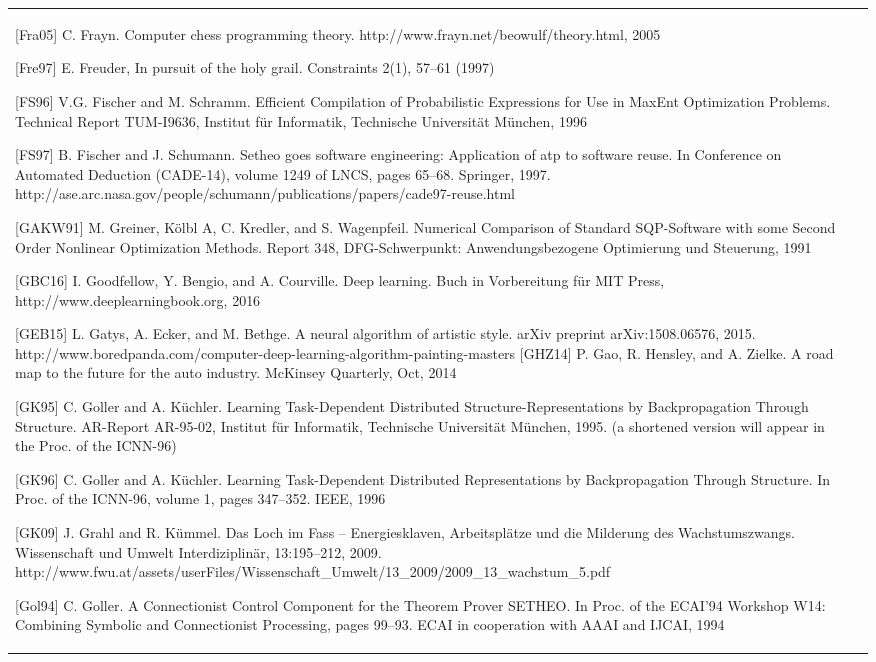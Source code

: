 \documentclass[10pt]{book}
\begin{document}
\begin{tabular}{|l|l|}
[Fra05] C. Frayn. Computer chess programming theory. http://www.frayn.net/beowulf/theory.html, 2005

[Fre97] E. Freuder, In pursuit of the holy grail. Constraints 2(1), 57–61 (1997)

[FS96] V.G. Fischer and M. Schramm. Efficient Compilation of Probabilistic Expressions for Use in MaxEnt Optimization Problems. Technical Report TUM-I9636, Institut für Informatik, Technische Universität München, 1996

[FS97] B. Fischer and J. Schumann. Setheo goes software engineering: Application of atp to software reuse. In Conference on Automated Deduction (CADE-14), volume 1249 of LNCS, pages 65–68. Springer, 1997. http://ase.arc.nasa.gov/people/schumann/publications/papers/cade97-reuse.html

[GAKW91] M. Greiner, Kölbl A, C. Kredler, and S. Wagenpfeil. Numerical Comparison of Standard SQP-Software with some Second Order Nonlinear Optimization Methods. Report 348, DFG-Schwerpunkt: Anwendungsbezogene Optimierung und Steuerung, 1991

[GBC16] I. Goodfellow, Y. Bengio, and A. Courville. Deep learning. Buch in Vorbereitung für MIT Press, http://www.deeplearningbook.org, 2016

[GEB15] L. Gatys, A. Ecker, and M. Bethge. A neural algorithm of artistic style. arXiv preprint arXiv:1508.06576, 2015. http://www.boredpanda.com/computer-deep-learning-algorithm-painting-masters
[GHZ14] P. Gao, R. Hensley, and A. Zielke. A road map to the future for the auto industry. McKinsey Quarterly, Oct, 2014

[GK95] C. Goller and A. Küchler. Learning Task-Dependent Distributed Structure-Representations by Backpropagation Through Structure. AR-Report AR-95-02, Institut für Informatik, Technische Universität München, 1995. (a shortened version will appear in the Proc. of the ICNN-96)

[GK96] C. Goller and A. Küchler. Learning Task-Dependent Distributed Representations by Backpropagation Through Structure. In Proc. of the ICNN-96, volume 1, pages 347–352. IEEE, 1996

[GK09] J. Grahl and R. Kümmel. Das Loch im Fass – Energiesklaven, Arbeitsplätze und die Milderung des Wachstumszwangs. Wissenschaft und Umwelt Interdiziplinär, 13:195–212, 2009. http://www.fwu.at/assets/userFiles/Wissenschaft\_Umwelt/13\_2009/2009\_13\_wachstum\_5.pdf

[Gol94] C. Goller. A Connectionist Control Component for the Theorem Prover SETHEO. In Proc. of the ECAI'94 Workshop W14: Combining Symbolic and Connectionist Processing, pages 99–93. ECAI in cooperation with AAAI and IJCAI, 1994


\end{tabular}
\end{document}
